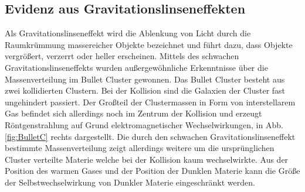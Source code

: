 \subsection*{Evidenz aus Gravitationslinseneffekten}
Als Gravitationslinseneffekt wird die Ablenkung von Licht durch die Raumkrümmung massereicher Objekte bezeichnet und führt dazu, dass Objekte vergrößert, verzerrt oder heller erscheinen\cite{Massey2010}.
Mittels des schwachen Gravitationslinseneffekts wurden außergewöhnliche Erkenntnisse über die Massenverteilung im Bullet Cluster gewonnen.
Das Bullet Cluster besteht aus zwei kollidierten Clustern.
Bei der Kollision sind die Galaxien der Cluster fast ungehindert passiert.
Der Großteil der Clustermassen in Form von interstellarem Gas befindet sich allerdings noch im Zentrum der Kollision und erzeugt Röntgenstrahlung auf Grund elektromagnetischer Wechselwirkungen, in Abb. \ref{fig:BulletC} rechts dargestellt.
Die durch den schwachen Gravitationslinseneffekt bestimmte Massenverteilung zeigt allerdings weitere um die ursprünglichen Cluster verteilte Materie welche bei der Kollision kaum wechselwirkte.
Aus der Position des warmen Gases und der Position der Dunklen Materie kann die Größe der Selbstwechselwirkung von Dunkler Materie eingeschränkt werden.\cite{Markevitch2003}
